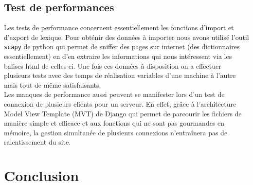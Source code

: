 \documentclass[a4paper, 12pt]{article}
\begin{document}
\subsection{Test de performances}
Les tests de performance concernent essentiellement les fonctions d'import et d'export de lexique. Pour obténir des données à importer nous avons utilisé l'outil \verb+scapy+ de python qui permet de sniffer des pages sur internet (des dictionnaires essentiellement) en d'en extraire les informations qui nous intéressent via les balises html de celles-ci. Une fois ces données à disposition on a effectuer plusieurs tests avec des temps de réalisation variables d'une machine à l'autre  mais tout de même satisfaisants.  
\\
Les manques de performance aussi peuvent se manifester lors d'un test de connexion de plusieurs clients pour un serveur. En effet, grâce à l'architecture Model View Template (MVT) de Django  qui permet de parcourir les fichiers de manière simple et efficace et aux fonctions qui ne sont pas gourmandes en mémoire, la gestion simultanée de plusieurs connexions n'entraînera pas de ralentissement du site.  

\section{Conclusion}
\end{document}
